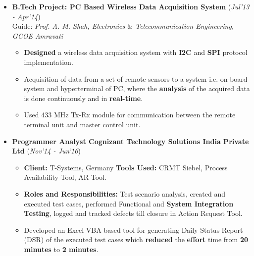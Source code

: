 \documentclass[10pt]{article}
\begin{document}
\begin{itemize}[leftmargin=0.4cm]
\item\textbf{B.Tech Project: PC Based Wireless Data Acquisition System}
\hfill{(\textit{Jul'13 - Apr'14})} \\
Guide: \textit{Prof. A. M. Shah, Electronics $\&$ Telecommunication Engineering, GCOE Amravati}\\
\vspace{-0.68cm}
\begin{itemize}
	\item \textbf{Designed} a wireless data acquisition system with \textbf{I2C} and \textbf{SPI} protocol implementation. 
	\vspace{-0.1cm}
	\item  Acquisition of data from a set of remote sensors to a system i.e. on-board system and hyperterminal of PC, where the \textbf{analysis} of the acquired data is done continuously and in  \textbf{real-time}.\vspace{-0.1cm}
	\item Used 433 MHz Tx-Rx module for communication between the remote terminal unit and master control unit.
\end{itemize}
\vspace{-0.2cm}

\end{itemize}

\colorbox{bl}{}
\vspace{-0.55cm}
\begin{itemize}[leftmargin=0.4cm]
	\item \textbf{Programmer Analyst \textpipe  \hspace{0.05cm} Cognizant Technology Solutions India Private Ltd} \hfill{(\textit{Nov'14 - Jun'16})}\\
	\vspace{-0.65cm}
	\begin{itemize}
	    \item \textbf{Client:} T-Systems, Germany \textpipe \textbf{ Tools Used:} CRMT Siebel, Process Availability Tool, AR-Tool.\vspace{-0.07cm}
		\item \textbf{Roles and Responsibilities:} Test scenario analysis, created and executed test cases, performed Functional and \textbf{System Integration Testing}, logged and tracked defects till closure in Action Request Tool.\vspace{-0.1cm}
		\item Developed an Excel-VBA based tool for generating Daily Status Report (DSR) of the executed test cases which \textbf{reduced} the \textbf{effort} time from \textbf{20 minutes} to \textbf{2 minutes}.
	\end{itemize}
\end{itemize}
\end{document}
